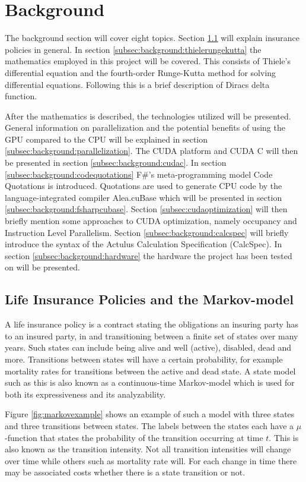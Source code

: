 \section{Background}
The background section will cover eight topics.
Section \ref{subsec:background:lifeinsurance} will explain insurance policies in general.
In section \ref{subsec:background:thielerungekutta} the mathematics employed in this project will be covered. 
This consists of Thiele's differential equation and the fourth-order Runge-Kutta method for solving differential equations.
Following this is a brief description of Diracs delta function.

After the mathematics is described, the technologies utilized will be presented.
General information on parallelization and the potential benefits of using the GPU compared to the CPU will be explained in section \ref{subsec:background:parallelization}.
The CUDA platform and CUDA C will then be presented in section \ref{subsec:background:cudac}.
In section \ref{subsec:background:codequotations} F\#'s meta-programming model Code Quotations is introduced.
Quotations are used to generate CPU code by the language-integrated compiler Alea.cuBase which will be presented in section \ref{subsec:background:fsharpcubase}.
Section \ref{subsec:cudaoptimization} will then briefly mention some approaches to CUDA optimization, namely occupancy and Instruction Level Parallelism.
Section \ref{subsec:background:calcspec} will briefly introduce the syntax of the Actulus Calculation Specification (CalcSpec).
In section \ref{subsec:background:hardware} the hardware the project has been tested on will be presented.

\subsection{Life Insurance Policies and the Markov-model}\label{subsec:background:lifeinsurance}
A life insurance policy is a contract stating the obligations an insuring party has to an insured party, in and transitioning between a finite set of states over many years.
Such states can include being alive and well (active), disabled, dead and more.
Transitions between states will have a certain probability, for example mortality rates for transitions between the active and dead state.
A state model such as this is also known as a continuous-time Markov-model\cite{norberg2000basic} which is used for both its expressiveness and its analyzability.

Figure \ref{fig:markovexample} shows an example of such a model with three states and three transitions between states. 
The labels between the states each have a $\mu$-function that states the probability of the transition occurring at time $t$. 
This is also known as the transition intensity.
Not all transition intensities will change over time while others such as mortality rate will.
For each change in time there may be associated costs whether there is a state transition or not.


